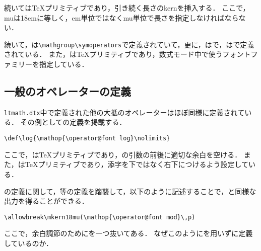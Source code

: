 \documentclass[autodetect-engine,dvipdfmx]{jsarticle}
\begin{document}
続いては\TeX プリミティブであり，引き続く長さのkernを挿入する．
ここで，muは18emに等しく，em単位ではなくmu単位で長さを指定しなければならない．

続いて，は\verb|\mathgroup\symoperators|で定義されていて，更に，はで，はで定義されている．
また，は\TeX プリミティブであり，数式モード中で使うフォントファミリーを指定している．

\subsection{一般のオペレーターの定義}
\texttt{ltmath.dtx}中で定義された他の大抵のオペレーターはほぼ同様に定義されている．
その例としての定義を掲載する．

\begin{lstlisting}[firstnumber=4062]
\def\log{\mathop{\operator@font log}\nolimits}
\end{lstlisting}

ここで，は\TeX プリミティブであり，の引数の前後に適切な余白を空ける．
また，は\TeX プリミティブであり，添字を下ではなく右下につけるよう設定している．

\begin{question}
の定義に関して，等の定義を踏襲して，以下のように記述することで，と同様な出力を得ることができる．

\texsource
\begin{lstlisting}
\allowbreak\mkern18mu(\mathop{\operator@font mod}\,p)
\end{lstlisting}

ここで，余白調節のために\cmd{,}を一つ抜いてある．
なぜこのようにを用いずに定義しているのか．
\end{question}



%
%
\end{document}
